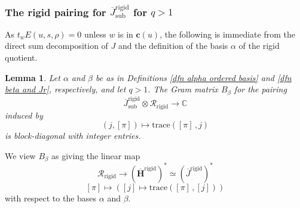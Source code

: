 \documentclass[10pt]{article}
\newcommand{\HH}{\mathbf{H}}
\newcommand{\trace}[2]{\mathrm{trace}\left({#1}\,,{#2}\right)}
\newcommand{\C}{\mathbb{C}}
\newcommand{\cc}{\mathbf{c}}
\newtheorem{lem}{Lemma}
\theoremstyle{definition}
\theoremstyle{remark}
\newcommand{\Hr}{\overline{\HH}^{\mathrm{rigid}}}
\newcommand{\Jr}{\overline{J}^{\mathrm{rigid}}}
\newcommand{\Jrs}{\overline{J}^{\mathrm{rigid}}_{\mathrm{sub}}}
\newcommand{\RHr}{\mathcal{R}_{\mathrm{rigid}}}
\begin{document}
\subsubsection{The rigid pairing for $\Jrs$ for $q>1$}
%
As $t_wE(u,s,\rho)=0$ unless $w$ is in $\cc(u)$, the following is immediate from the direct sum decomposition 
of $J$ and the definition of the basis $\alpha$ of the rigid quotient.
%
\begin{lem}
\label{lem J pairing is block diagonal}
Let $\alpha$ and $\beta$ be as in Definitions \ref{dfn alpha ordered basis} and \ref{dfn beta and Jr}, 
respectively, and let $q>1$. The Gram matrix $B_\beta$ for the pairing
%
\[
\Jrs\otimes\RHr\to\C
\]
%
induced by 
%
\[
(j, [\pi])\mapsto\trace{[\pi]}{j}
\]
%
is block-diagonal with integer entries.
\end{lem}
%
We view $B_\beta$ as giving the linear map 
%
\[
\RHr\to(\Hr)^*\simeq (\Jr)^*
\]
%
\[
[\pi]\mapsto\left([j]\mapsto\trace{[\pi]}{[j]}\right)
\]
%
with respect to the bases $\alpha$ and $\beta$. 
\end{document}
